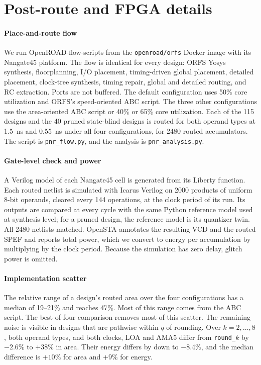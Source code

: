 \documentclass[11pt]{article}
\begin{document}
\section{Post-route and FPGA details}

\paragraph{Place-and-route flow}
We run OpenROAD-flow-scripts from the \texttt{openroad/orfs} Docker image
with its Nangate45 platform. The flow is identical for every design: ORFS
Yosys synthesis, floorplanning, I/O placement, timing-driven global
placement, detailed placement, clock-tree synthesis, timing repair, global
and detailed routing, and RC extraction. Ports are not buffered. The
default configuration uses 50\% core utilization and ORFS's speed-oriented
ABC script. The three other configurations use the area-oriented ABC
script or 40\% or 65\% core utilization. Each of the 115 designs and the 40
pruned state-blind designs is routed for both operand types at 1.5~ns and
0.55~ns under all four configurations, for 2480 routed accumulators. The
script is \texttt{pnr\_flow.py}, and the analysis is
\texttt{pnr\_analysis.py}.

\paragraph{Gate-level check and power}
A Verilog model of each Nangate45 cell is generated from its Liberty
function. Each routed netlist is simulated with Icarus Verilog on 2000
products of uniform 8-bit operands, cleared every 144 operations, at the
clock period of its run. Its outputs are compared at every cycle with the
same Python reference model used at synthesis level; for a pruned design,
the reference model is its quantizer twin. All 2480 netlists matched.
OpenSTA annotates the resulting VCD and the routed SPEF and reports total
power, which we convert to energy per accumulation by multiplying by the
clock period. Because the simulation has zero delay, glitch power is
omitted.

\paragraph{Implementation scatter}
The relative range of a design's routed area over the four
configurations has a median of 19--21\% and reaches 47\%.
Most of this range comes from the ABC script. The best-of-four
comparison removes most of this scatter. The
remaining noise is visible in designs that are pathwise within $q$ of
rounding. Over $k=2,\ldots,8$, both operand types, and both clocks, LOA and
AMA5 differ from \texttt{round\_$k$} by $-2.6\%$ to $+38\%$ in area. Their
energy differs by down to $-8.4\%$, and the median difference is $+10\%$
for area and $+9\%$ for energy.
\end{document}
